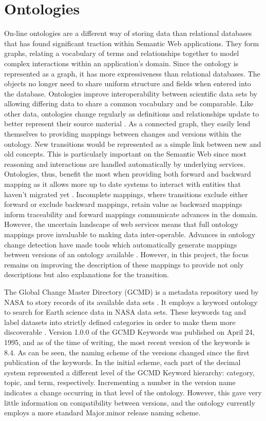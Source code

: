 \section{Ontologies}

On-line ontologies are a different way of storing data than relational databases that has found significant traction within Semantic Web applications.
They form graphs, relating a vocabulary of terms and relationships together to model complex interactions within an application's domain.
Since the ontology is represented as a graph, it has more expressiveness than relational databases.
The objects no longer need to share uniform structure and fields when entered into the database.
Ontologies improve interoperability between scientific data sets by allowing differing data to share a common vocabulary and be comparable.
Like other data, ontologies change regularly as definitions and relationships update to better represent their source material \cite{Ochs:2015:SVS:2826733.2826866}.
As a connected graph, they easily lend themselves to providing mappings between changes and versions within the ontology.
New transitions would be represented as a simple link between new and old concepts.
This is particularly important on the Semantic Web since most reasoning and interactions are handled automatically by underlying services.
Ontologies, thus, benefit the most when providing both forward and backward mapping as it allows more up to date systems to interact with entities that haven't migrated yet \cite{Klein01ontologyversioning}.
Incomplete mappings, where transitions exclude either forward or exclude backward mappings, retain value as backward mappings inform traceability and forward mappings communicate advances in the domain.
However, the uncertain landscape of web services means that full ontology mappings prove invaluable to making data inter-operable.
Advances in ontology change detection have made tools which automatically generate mappings between versions of an ontology available \cite{Hartung201315}.
However, in this project, the focus remains on improving the description of these mappings to provide not only descriptions but also explanations for the transition.

The Global Change Master Directory (GCMD) is a metadata repository used by NASA to story records of its available data sets \cite{Miled:2001:GCM:372202.372324}.
It employs a keyword ontology to search for Earth science data in NASA data sets.
These keywords tag and label datasets into strictly defined categories in order to make them more discoverable \cite{GCMDKey}.
Version 1.0.0 of the GCMD Keywords was published on April 24, 1995, and as of the time of writing, the most recent version of the keywords is 8.4.
As can be seen, the naming scheme of the versions changed since the first publication of the keywords.
In the initial scheme, each part of the decimal system represented a different level of the GCMD Keyword hierarchy: category, topic, and term, respectively.
Incrementing a number in the version name indicates a change occurring in that level of the ontology.
However, this gave very little information on compatibility between versions, and the ontology currently employs a more standard Major.minor release naming scheme.

